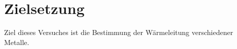 \section{Zielsetzung}
\label{sec:Ziel}
Ziel dieses Versuches ist die Bestimmung der Wärmeleitung verschiedener Metalle.
